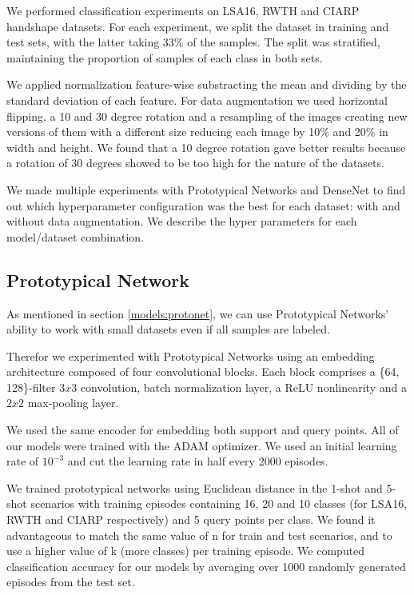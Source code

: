 We performed classification experiments on LSA16, RWTH and CIARP  handshape datasets. For each experiment, we split the dataset in training and test sets, with the latter taking 33\% of the samples.  The split was stratified,  maintaining the proportion of samples of each class in both sets.

We applied normalization feature-wise substracting the mean and dividing by the standard deviation of each feature. For data augmentation we used horizontal flipping, a 10 and 30 degree rotation and a resampling of the images creating new versions of them with a different size reducing each image by 10\% and 20\% in width and height. We found that a 10 degree rotation gave better results because a rotation of 30 degrees showed to be too high for the nature of the datasets.

We made multiple experiments with Prototypical Networks and DenseNet to find out which hyperparameter configuration was the best for each dataset: with and without data augmentation. We describe the hyper parameters for each model/dataset combination.

\subsection{Prototypical Network}

As mentioned in section \ref{models:protonet}, we can use Prototypical Networks' ability to work with small datasets even if all samples are labeled.

Therefor we experimented with Prototypical Networks using an embedding architecture composed of four convolutional blocks. Each block comprises a \{64, 128\}-filter $3 x 3$ convolution, batch normalization layer, a ReLU nonlinearity and a $2 x 2$ max-pooling layer.

We used the same encoder for embedding both support and query points. All of our models were trained  with the ADAM\cite{Adam} optimizer. We used an initial learning rate of $10^{-3}$ and cut the learning rate in half every 2000 episodes.

We trained prototypical networks using Euclidean distance in the 1-shot and 5-shot scenarios with training episodes containing 16, 20 and 10 classes (for LSA16, RWTH and CIARP respectively) and 5 query points per class. We found it advantageous to match the same value of n for train and test scenarios, and to use a higher value of k (more classes) per training episode. We computed classification accuracy for our models by averaging over 1000 randomly generated episodes from the test set.

